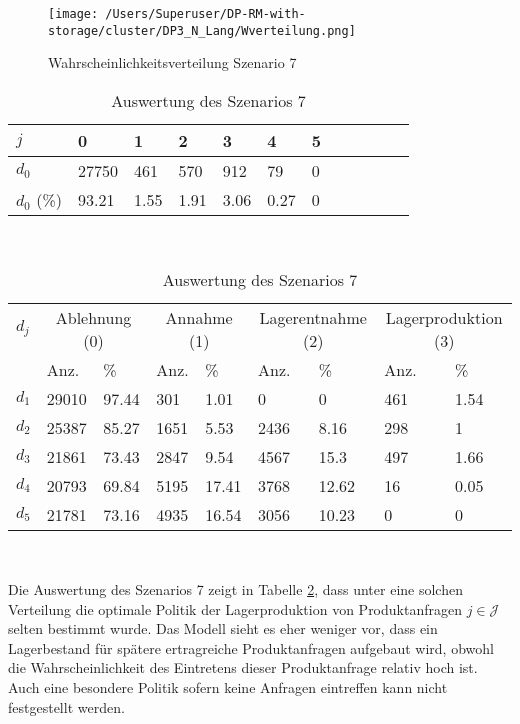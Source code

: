 \begin{figure}[h!]
  \begin{center}
    \texttt{[image: /Users/Superuser/DP-RM-with-storage/cluster/DP3\_N\_Lang/Wverteilung.png]}
    \caption{Wahrscheinlichkeitsverteilung Szenario 7}  \label{SB7}
  \end{center}
\end{figure}

\begin{table}[h!]
\renewcommand{\arraystretch}{1.5}
  \begin{center}
    \caption{Auswertung des Szenarios 7}  \label{AS7}
    \vspace*{3mm}
    \begin{tabular}{l l l l l l l l l l l l }  \hline 
         $j$ & 0 & 1  & 2 & 3 & 4  & 5   \\  \hline
$d_{0}$ &  27750 &  461 &  570 &  912 &  79 &  0 \\
$d_{0}$ (\%) &  93.21 &  1.55 &  1.91 &  3.06 &  0.27 &  0 \\
\hline
    \end{tabular} \\[3mm]
        \begin{tabular}{ l l l l l l l l l}   \hline    %
    $d_j$ & \multicolumn{2}{c}{Ablehnung (0)} & \multicolumn{2}{c}{Annahme (1)}  & \multicolumn{2}{c}{Lagerentnahme (2)} & \multicolumn{2}{c}{Lagerproduktion (3)}\\
    & Anz. & \% & Anz. & \% & Anz. & \% & Anz. & \% \\ \hline 
$d_{1}$ &  29010 &  97.44 &   301 &   1.01 &   0 &    0 &  461 &  1.54 \\
$d_{2}$ &  25387 &  85.27 &  1651 &   5.53 &  2436 &   8.16 &  298 &     1 \\
$d_{3}$ &  21861 &  73.43 &  2847 &   9.54 &  4567 &   15.3 &  497 &  1.66 \\
$d_{4}$ &  20793 &  69.84 &  5195 &  17.41 &  3768 &  12.62 &   16 &  0.05 \\
$d_{5}$ &  21781 &  73.16 &  4935 &  16.54 &  3056 &  10.23 &  0 &   0 \\
          \hline
   \end{tabular} \\[3mm]
     \end{center}
\end{table}

Die Auswertung des Szenarios 7 zeigt in Tabelle \ref{AS7}, dass unter eine solchen Verteilung die optimale Politik der Lagerproduktion von Produktanfragen $j\in\mathcal{J}$ selten bestimmt wurde. Das Modell sieht es eher weniger vor, dass ein Lagerbestand für spätere ertragreiche Produktanfragen aufgebaut wird, obwohl die Wahrscheinlichkeit des Eintretens dieser Produktanfrage relativ hoch ist. Auch eine besondere Politik sofern keine Anfragen eintreffen kann nicht festgestellt werden.\\[10mm]

